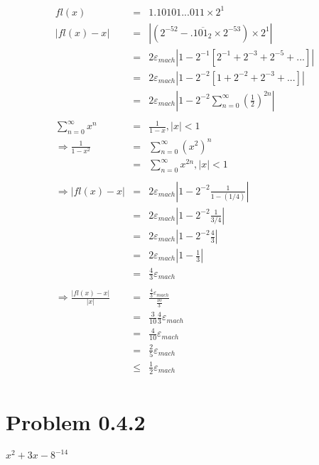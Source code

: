 \documentclass[12pt]{article}
\begin{document}
\begin{eqnarray*}
fl(x) & = & 1.10101...011\times2^{1}\\
\left|fl(x) - x\right| & = & \left|(2^{-52} - .1\overline{01}_{2}\times2^{-53})\times2^{1}\right|\\
& = & 2\varepsilon_{mach}\left|1 - 2^{-1}[2^{-1} + 2^{-3} + 2^{-5} + ...]\right|\\
& = & 2\varepsilon_{mach}\left|1 - 2^{-2}[1 + 2^{-2} + 2^{-3} + ...]\right|\\
& = & 2\varepsilon_{mach}\left|1 - 2^{-2}\sum_{n=0}^{\infty} (\frac{1}{2})^{2n}\right|\\
\\
\sum_{n=0}^{\infty} x^{n} & = & \frac{1}{1-x}, \left|x\right| < 1\\
\Rightarrow\frac{1}{1-x^{2}} & = & \sum_{n=0}^{\infty} (x^{2})^{n}\\
& = &\sum_{n=0}^{\infty} x^{2n}, \left|x\right| < 1\\
\\
\Rightarrow\left|fl(x) - x\right| & = & 2\varepsilon_{mach}\left|1 - 2^{-2}\frac{1}{1-(1/4)}\right|\\
& = & 2\varepsilon_{mach}\left|1 - 2^{-2}\frac{1}{3/4}\right|\\
& = & 2\varepsilon_{mach}\left|1 - 2^{-2}\frac{4}{3}\right|\\
& = & 2\varepsilon_{mach}\left|1 - \frac{1}{3}\right|\\
& = & \frac{4}{3}\varepsilon_{mach}\\
\\
\Rightarrow\frac{\left|fl(x) - x\right|}{\left|x\right|} & = & \frac{\frac{4}{3}\varepsilon_{mach}}{\frac{10}{3}}\\
& = & \frac{3}{10}\frac{4}{3}\varepsilon_{mach}\\
& = & \frac{4}{10}\varepsilon_{mach}\\
& = & \frac{2}{5}\varepsilon_{mach}\\
& \leq & \frac{1}{2}\varepsilon_{mach}\\
\end{eqnarray*}

\section*{Problem 0.4.2}

\(x^{2} + 3x - 8^{-14}\)
\end{document}
